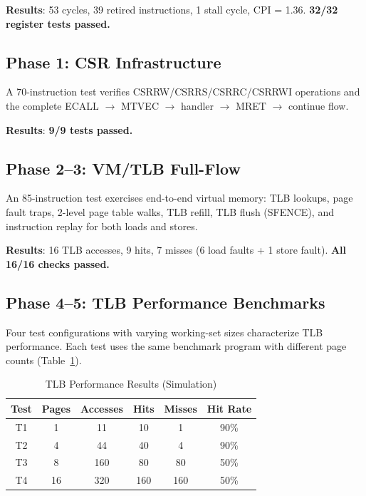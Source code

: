 \documentclass[conference]{IEEEtran}
\begin{document}
\textbf{Results}: 53 cycles, 39 retired instructions, 1 stall cycle, CPI = 1.36. \textbf{32/32 register tests passed.}

\subsection{Phase 1: CSR Infrastructure}

A 70-instruction test verifies CSRRW/CSRRS/CSRRC/CSRRWI operations and the complete ECALL $\rightarrow$ MTVEC $\rightarrow$ handler $\rightarrow$ MRET $\rightarrow$ continue flow.

\textbf{Results}: \textbf{9/9 tests passed.}

\subsection{Phase 2--3: VM/TLB Full-Flow}

An 85-instruction test exercises end-to-end virtual memory: TLB lookups, page fault traps, 2-level page table walks, TLB refill, TLB flush (SFENCE), and instruction replay for both loads and stores.

\textbf{Results}: 16 TLB accesses, 9 hits, 7 misses (6 load faults + 1 store fault). \textbf{All 16/16 checks passed.}

\subsection{Phase 4--5: TLB Performance Benchmarks}

Four test configurations with varying working-set sizes characterize TLB performance. Each test uses the same benchmark program with different page counts (Table~\ref{tab:perf}).

\begin{table}[htbp]
\caption{TLB Performance Results (Simulation)}
\begin{center}
\begin{tabular}{|c|c|c|c|c|c|}
\hline
\textbf{Test} & \textbf{Pages} & \textbf{Accesses} & \textbf{Hits} & \textbf{Misses} & \textbf{Hit Rate} \\
\hline
T1 & 1 & 11 & 10 & 1 & 90\% \\
T2 & 4 & 44 & 40 & 4 & 90\% \\
T3 & 8 & 160 & 80 & 80 & 50\% \\
T4 & 16 & 320 & 160 & 160 & 50\% \\
\hline
\end{tabular}
\label{tab:perf}
\end{center}
\end{table}
\end{document}

